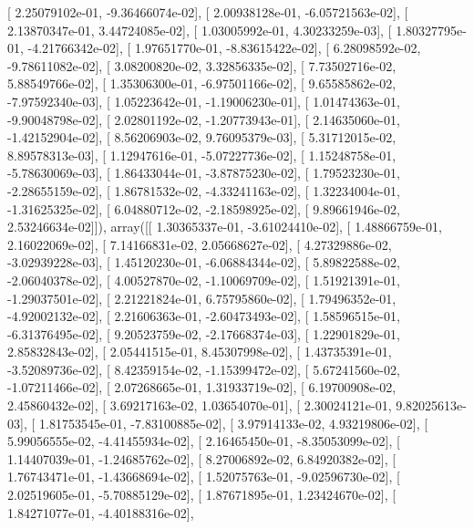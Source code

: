 \documentclass{article}
\begin{document}
       [  2.25079102e-01,  -9.36466074e-02],
       [  2.00938128e-01,  -6.05721563e-02],
       [  2.13870347e-01,   3.44724085e-02],
       [  1.03005992e-01,   4.30233259e-03],
       [  1.80327795e-01,  -4.21766342e-02],
       [  1.97651770e-01,  -8.83615422e-02],
       [  6.28098592e-02,  -9.78611082e-02],
       [  3.08200820e-02,   3.32856335e-02],
       [  7.73502716e-02,   5.88549766e-02],
       [  1.35306300e-01,  -6.97501166e-02],
       [  9.65585862e-02,  -7.97592340e-03],
       [  1.05223642e-01,  -1.19006230e-01],
       [  1.01474363e-01,  -9.90048798e-02],
       [  2.02801192e-02,  -1.20773943e-01],
       [  2.14635060e-01,  -1.42152904e-02],
       [  8.56206903e-02,   9.76095379e-03],
       [  5.31712015e-02,   8.89578313e-03],
       [  1.12947616e-01,  -5.07227736e-02],
       [  1.15248758e-01,  -5.78630069e-03],
       [  1.86433044e-01,  -3.87875230e-02],
       [  1.79523230e-01,  -2.28655159e-02],
       [  1.86781532e-02,  -4.33241163e-02],
       [  1.32234004e-01,  -1.31625325e-02],
       [  6.04880712e-02,  -2.18598925e-02],
       [  9.89661946e-02,   2.53246634e-02]]), array([[  1.30365337e-01,  -3.61024410e-02],
       [  1.48866759e-01,   2.16022069e-02],
       [  7.14166831e-02,   2.05668627e-02],
       [  4.27329886e-02,  -3.02939228e-03],
       [  1.45120230e-01,  -6.06884344e-02],
       [  5.89822588e-02,  -2.06040378e-02],
       [  4.00527870e-02,  -1.10069709e-02],
       [  1.51921391e-01,  -1.29037501e-02],
       [  2.21221824e-01,   6.75795860e-02],
       [  1.79496352e-01,  -4.92002132e-02],
       [  2.21606363e-01,  -2.60473493e-02],
       [  1.58596515e-01,  -6.31376495e-02],
       [  9.20523759e-02,  -2.17668374e-03],
       [  1.22901829e-01,   2.85832843e-02],
       [  2.05441515e-01,   8.45307998e-02],
       [  1.43735391e-01,  -3.52089736e-02],
       [  8.42359154e-02,  -1.15399472e-02],
       [  5.67241560e-02,  -1.07211466e-02],
       [  2.07268665e-01,   1.31933719e-02],
       [  6.19700908e-02,   2.45860432e-02],
       [  3.69217163e-02,   1.03654070e-01],
       [  2.30024121e-01,   9.82025613e-03],
       [  1.81753545e-01,  -7.83100885e-02],
       [  3.97914133e-02,   4.93219806e-02],
       [  5.99056555e-02,  -4.41455934e-02],
       [  2.16465450e-01,  -8.35053099e-02],
       [  1.14407039e-01,  -1.24685762e-02],
       [  8.27006892e-02,   6.84920382e-02],
       [  1.76743471e-01,  -1.43668694e-02],
       [  1.52075763e-01,  -9.02596730e-02],
       [  2.02519605e-01,  -5.70885129e-02],
       [  1.87671895e-01,   1.23424670e-02],
       [  1.84271077e-01,  -4.40188316e-02],
\end{document}
